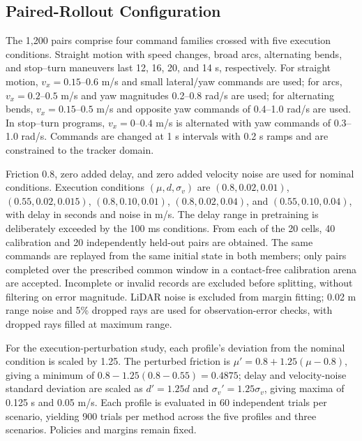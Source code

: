 \documentclass[conference]{IEEEtran}
\begin{document}
\subsection{Paired-Rollout Configuration}
The 1,200 pairs comprise four command families crossed with five execution
conditions. Straight motion with speed changes, broad arcs, alternating bends,
and stop--turn maneuvers last 12, 16, 20, and 14 s, respectively.
For straight motion, $v_x=0.15$--$0.6$ m/s and small lateral/yaw commands are used;
for arcs, $v_x=0.2$--$0.5$ m/s and yaw magnitudes 0.2--0.8 rad/s are used;
for alternating bends, $v_x=0.15$--$0.5$ m/s and opposite yaw commands of
0.4--1.0 rad/s are used. In stop--turn programs, $v_x=0$--$0.4$ m/s is alternated
with yaw commands of 0.3--1.0 rad/s. Commands are changed at 1 s intervals with
0.2 s ramps and are constrained to the tracker domain.

Friction 0.8, zero added delay, and zero added velocity noise are used for
nominal conditions. Execution conditions $(\mu,d,\sigma_v)$ are
$(0.8,0.02,0.01)$, $(0.55,0.02,0.015)$,
$(0.8,0.10,0.01)$, $(0.8,0.02,0.04)$, and
$(0.55,0.10,0.04)$, with delay in seconds and noise in m/s.
The delay range in pretraining is deliberately exceeded by the 100 ms conditions.
From each of the 20 cells, 40 calibration and 20 independently held-out pairs
are obtained. The same commands are replayed from the same initial state in both
members; only pairs completed over the prescribed common window in a contact-free
calibration arena are accepted. Incomplete or invalid records are excluded before splitting,
without filtering on error magnitude. LiDAR noise is excluded from margin
fitting; 0.02 m range noise and 5\% dropped rays are used for observation-error
checks, with dropped rays filled at maximum range.

For the execution-perturbation study, each profile's deviation from the nominal
condition is scaled by 1.25. The perturbed friction is
$\mu'=0.8+1.25(\mu-0.8)$, giving a minimum of
$0.8-1.25(0.8-0.55)=0.4875$; delay and velocity-noise standard deviation are
scaled as $d'=1.25d$ and $\sigma_v'=1.25\sigma_v$, giving maxima of
0.125 s and 0.05 m/s. Each profile is evaluated in 60 independent trials per
scenario, yielding 900 trials per method across the five profiles and three
scenarios. Policies and margins remain fixed.
\end{document}
